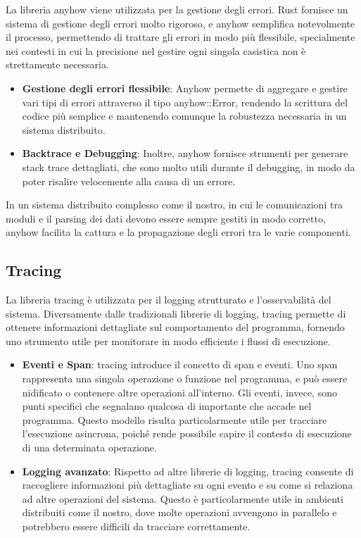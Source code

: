 \documentclass[target=bach,aauheader=,style=]{thud}
\begin{document}
La libreria anyhow \cite{rust_anyhow} viene utilizzata per la gestione degli errori. Rust fornisce un sistema di gestione degli errori molto rigoroso, e anyhow semplifica notevolmente il processo, permettendo di trattare gli errori in modo più flessibile, specialmente nei contesti in cui la precisione nel gestire ogni singola casistica non è strettamente necessaria.
\begin{itemize}
  \item \textbf{Gestione degli errori flessibile}: Anyhow permette di aggregare e gestire vari tipi di errori attraverso il tipo anyhow::Error, rendendo la scrittura del codice più semplice e mantenendo comunque la robustezza necessaria in un sistema distribuito.
  \item \textbf{Backtrace e Debugging}: Inoltre, anyhow fornisce strumenti per generare stack trace dettagliati, che sono molto utili durante il debugging, in modo da poter risalire velocemente alla causa di un errore.
\end{itemize}
In un sistema distribuito complesso come il nostro, in cui le comunicazioni tra moduli e il parsing dei dati devono essere sempre gestiti in modo corretto, anyhow facilita la cattura e la propagazione degli errori tra le varie componenti.

\subsection{Tracing}
La libreria tracing \cite{rust_tracing} è utilizzata per il logging strutturato e l'osservabilità del sistema. Diversamente dalle tradizionali librerie di logging, tracing permette di ottenere informazioni dettagliate sul comportamento del programma, fornendo uno strumento utile per monitorare in modo efficiente i flussi di esecuzione.
\begin{itemize}
  \item \textbf{Eventi e Span}: tracing introduce il concetto di span e eventi. Uno span rappresenta una singola operazione o funzione nel programma, e può essere nidificato o contenere altre operazioni all'interno. Gli eventi, invece, sono punti specifici che segnalano qualcosa di importante che accade nel programma. Questo modello risulta particolarmente utile per tracciare l'esecuzione asincrona, poiché rende possibile capire il contesto di esecuzione di una determinata operazione.
  \item \textbf{Logging avanzato}: Rispetto ad altre librerie di logging, tracing consente di raccogliere informazioni più dettagliate su ogni evento e su come si relaziona ad altre operazioni del sistema. Questo è particolarmente utile in ambienti distribuiti come il nostro, dove molte operazioni avvengono in parallelo e potrebbero essere difficili da tracciare correttamente.
\end{itemize}
\end{document}
